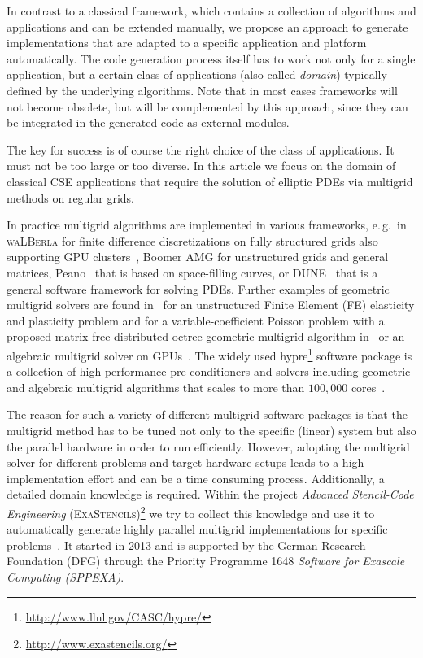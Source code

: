 \documentclass[onecolumn]{svjour3}
\newcommand{\Walberla}{\textsc{waLBerla}}
\newcommand{\exastencils}{\textsc{ExaStencils}}
\begin{document}
In contrast to a classical framework, which contains a collection of algorithms and applications and can be extended manually, we propose an approach to generate implementations that are adapted to a specific application and platform automatically. 
The code generation process itself has to work not only for a single application, but a certain class of applications (also called \textit{domain}) typically defined by the underlying algorithms. Note that in most cases frameworks will not become obsolete, but will be complemented by this approach, since they can be integrated in the generated code as external modules.

The key for success is of course the right choice of the class of applications. It must not be too large or too diverse.
In this article we focus on the domain of classical CSE applications that require the solution of elliptic PDEs via multigrid methods on regular grids.

In practice multigrid algorithms are implemented in various frameworks, e.\,g.\ in \Walberla{} for finite difference discretizations on
fully structured grids also supporting GPU clusters~\cite{KoestlerRitterHarbin10}, Boomer AMG \cite{Falgout99} for unstructured grids and general matrices, Peano~\cite{bungartz2010pde} that is based on space-filling curves, or DUNE~\cite{Bastian2008} that is a general software framework for solving PDEs.
Further examples of geometric multigrid solvers are found in~\cite{Adams00} for an unstructured Finite Element (FE) elasticity and plasticity problem and for a variable-coefficient Poisson problem with a proposed matrix-free distributed octree geometric multigrid algorithm in~\cite{sampath2010parallel} or
an algebraic multigrid solver on GPUs~\cite{haase2010parallel}. The widely used hypre\footnote{\url{http://www.llnl.gov/CASC/hypre/}} software package is a collection of high performance pre-conditioners and solvers including geometric and algebraic multigrid algorithms that scales to more than $100,000$ cores~\cite{baker2012scaling}.  

The reason for such a variety of different multigrid software packages is that the multigrid method has to be tuned not only to the specific (linear) system but also the parallel hardware in order to run efficiently.  
However, adopting the multigrid solver for different problems and target hardware setups leads to a high implementation effort and can be a time consuming process. Additionally, a detailed domain knowledge is required. Within the project \textit{Advanced Stencil-Code Engineering} (\exastencils)\footnote{\url{http://www.exastencils.org/}} we try to collect this knowledge and use it to automatically generate highly parallel multigrid implementations for specific problems~\cite{koestlerkuckukparco13,koestlerapelhistencils13,kronawitterhistencils13}. It started in 2013 and is supported by the German Research Foundation (DFG) through the Priority Programme 1648 \textit{Software for Exascale Computing (SPPEXA)}. 
\end{document}

